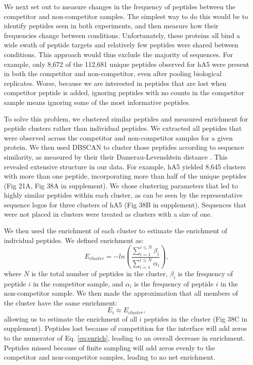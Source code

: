 We next set out to measure changes in the frequency of peptides between
the competitor and non-competitor samples. The simplest way to do
this would be to identify peptides seen in both experiments, and then
measure how their frequencies change between conditions. Unfortunately,
these proteins all bind a wide swath of peptide targets and relatively
few peptides were shared between conditions. This approach would thus
exclude the majority of sequences. For example, only 8,672 of the
112,681 unique peptides observed for hA5 were present in both the
competitor and non-competitor, even after pooling biological replicates.
Worse, because we are interested in peptides that are lost when competitor
peptide is added, ignoring peptides with no counts in the competitor
sample means ignoring some of the most informative peptides. 

To solve this problem, we clustered similar peptides and measured
enrichment for peptide clusters rather than individual peptides. We
extracted all peptides that were observed across the competitor and
non-competitor samples for a given protein. We then used DBSCAN to
cluster those peptides according to sequence similarity, as measured
by their their Damerau-Levenshtein distance \citep{damerau_technique_1964,ester_density-based_1996}.
This revealed extensive structure in our data. For example, hA5 yielded
8,645 clusters with more than one peptide, incorporating more than
half of the unique peptides (Fig 21A, Fig 38A in supplement). We chose clustering
parameters that led to highly similar peptides within each cluster,
as can be seen by the representative sequence logos for three clusters
of hA5 (Fig 38B in supplement). Sequences that were not placed in clusters were
treated as clusters with a size of one. 

We then used the enrichment of each cluster to estimate the enrichment
of individual peptides. We defined enrichment as: 
\begin{equation}
E_{cluster}=-ln\left(\frac{\sum_{i=1}^{i\le N}\beta_{i}}{\sum_{i=1}^{i\le N}\alpha_{i}}\right),\label{eq:enrich}
\end{equation}
where $N$ is the total number of peptides in the cluster, $\beta_{i}$
is the frequency of peptide $i$ in the competitor sample, and $\alpha_{i}$
is the frequency of peptide $i$ in the non-competitor sample. We
then made the approximation that all members of the cluster have the
same enrichment:
\begin{equation}
E_{i}\approx E_{cluster},
\end{equation}
allowing us to estimate the enrichment of all $i$ peptides in the
cluster (Fig 38C in supplement). Peptides lost because of competition for the interface
will add zeros to the numerator of Eq. \ref{eq:enrich}, leading to
an overall decrease in enrichment. Peptides missed because of finite
sampling will add zeros evenly to the competitor and non-competitor
samples, leading to no net enrichment. 

